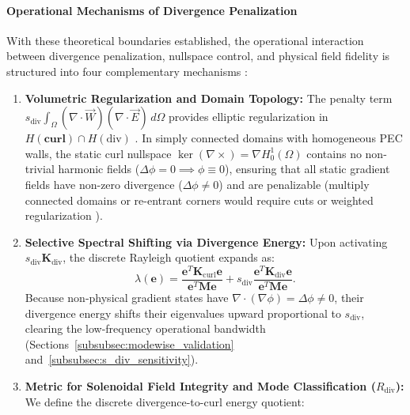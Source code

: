 \documentclass[preprint,12pt]{elsarticle}
\begin{document}
\paragraph{Operational Mechanisms of Divergence Penalization}
With these theoretical boundaries established, the operational interaction between divergence penalization, nullspace control, and physical field fidelity is structured into four complementary mechanisms \cite{monk2003finite, bossavit1998computational, boffi2013mixed}:
\begin{enumerate}
    \item \textbf{Volumetric Regularization and Domain Topology:} The penalty term $s_{\mathrm{div}} \int_\Omega (\nabla \cdot \vec{W})(\nabla \cdot \vec{E}) \, d\Omega$ provides elliptic regularization in $H(\mathbf{curl}) \cap H(\mathrm{div})$ \cite{monk2003finite, boffi2013mixed}. In simply connected domains with homogeneous PEC walls, the static curl nullspace $\ker(\nabla \times) = \nabla H_0^1(\Omega)$ contains no non-trivial harmonic fields ($\Delta \phi = 0 \implies \phi \equiv 0$), ensuring that all static gradient fields have non-zero divergence ($\Delta \phi \neq 0$) and are penalizable (multiply connected domains or re-entrant corners would require cuts or weighted regularization \cite{bossavit1998computational, gross2004electromagnetic, costabel1991coercive, costabel2002weighted}).
    \item \textbf{Selective Spectral Shifting via Divergence Energy:} Upon activating $s_{\mathrm{div}} \mathbf{K}_{\mathrm{div}}$, the discrete Rayleigh quotient expands as:
          \begin{equation}
              \lambda(\mathbf{e}) = \frac{\mathbf{e}^T \mathbf{K}_{\mathrm{curl}} \mathbf{e}}{\mathbf{e}^T \mathbf{M} \mathbf{e}} + s_{\mathrm{div}} \frac{\mathbf{e}^T \mathbf{K}_{\mathrm{div}} \mathbf{e}}{\mathbf{e}^T \mathbf{M} \mathbf{e}}.
              \label{eq:rayleigh_penalty_expansion}
          \end{equation}
          Because non-physical gradient states have $\nabla \cdot (\nabla \phi) = \Delta \phi \neq 0$, their divergence energy shifts their eigenvalues upward proportional to $s_{\mathrm{div}}$, clearing the low-frequency operational bandwidth (Sections~\ref{subsubsec:modewise_validation} and~\ref{subsubsec:s_div_sensitivity}).
    \item \textbf{Metric for Solenoidal Field Integrity and Mode Classification ($R_{\mathrm{div}}$):} We define the discrete divergence-to-curl energy quotient:
          \begin{equation}

\end{equation}
\end{enumerate}
\end{document}

